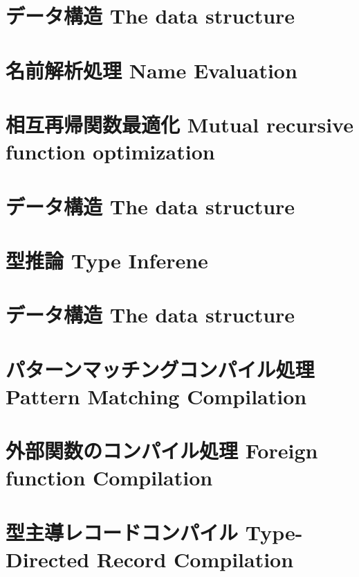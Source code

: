 \chapter{\txt
{データ構造}
{The  data structure}
}
\label{chap:IDCalc}

\chapter{\txt
{名前解析処理}
{Name Evaluation}
}
\label{chap:nameevaluation}

\chapter{\txt
{相互再帰関数最適化}
{Mutual recursive function optimization}
}
\label{chap:valrecoptimize}

\chapter{\txt
{データ構造}
{The  data structure}
}
\label{chap:TypedCalc}

\chapter{\txt
{型推論}
{Type Inferene}
}
\label{chap:typeinference}

\chapter{\txt
{データ構造}
{The  data structure}
}
\label{chap:RecordCalc}

\chapter{\txt
{パターンマッチングコンパイル処理}
{Pattern Matching Compilation}
}
\label{chap:matchcompilation}

\chapter{\txt
{外部関数のコンパイル処理}
{Foreign function Compilation}
}
\label{chap:fficompilation}

\chapter{\txt
{型主導レコードコンパイル}
{Type-Directed Record Compilation}
}
\label{chap:recorcdcompilation}

